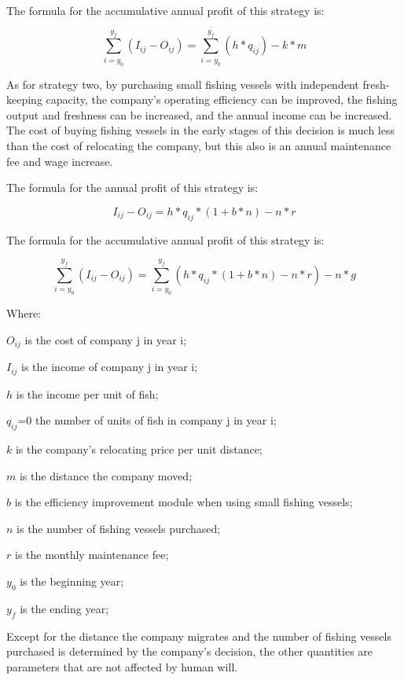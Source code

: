 \documentclass{mcmthesis}
\numberwithin{figure}{section}
\numberwithin{table}{section}
\begin{document}
The formula for the accumulative annual profit of this strategy is:

\begin{equation}\label{2}
  \sum_{i=y_0}^{y_f} (I_{ij} - O_{ij}) = \sum_{i=y_0}^{y_f} (h * q_{ij}) - k*m
  \end{equation}
  
As for strategy two, by purchasing small fishing vessels with independent fresh-keeping capacity, the company's operating efficiency can be improved, the fishing output and freshness can be increased, and the annual income can be increased. The cost of buying fishing vessels in the early stages of this decision is much less than the cost of relocating the company, but this also is an annual maintenance fee and wage increase.

The formula for the annual profit of this strategy is:

\begin{equation}\label{3}
  I_{ij} - O_{ij} = h * q_{ij} * (1+b*n) - n*r
  \end{equation}

The formula for the accumulative annual profit of this strategy is:

\begin{equation}\label{4}
  \sum_{i=y_0}^{y_f} (I_{ij} - O_{ij}) = \sum_{i=y_0}^{y_f} (h * q_{ij}* (1+b*n) - n * r ) - n * g
\end{equation}
  

Where:

$O_{ij}$ is the cost of company j in year i;

$I_{ij}$ is the income of company j in year i;

$h$ is the income per unit of fish;

$q_{ij}$=0 the number of units of fish in company j in year i;

$k$ is the company's relocating price per unit distance;

$m$ is the distance the company moved;

$b$ is the efficiency improvement module when using small fishing vessels;

$n$ is the number of fishing vessels purchased;

$r$ is the monthly maintenance fee;

$y_0$ is the beginning year;

$y_f$ is the ending year;

Except for the distance the company migrates and the number of fishing vessels purchased is determined by the company's decision, the other quantities are parameters that are not affected by human will.
\end{document}
